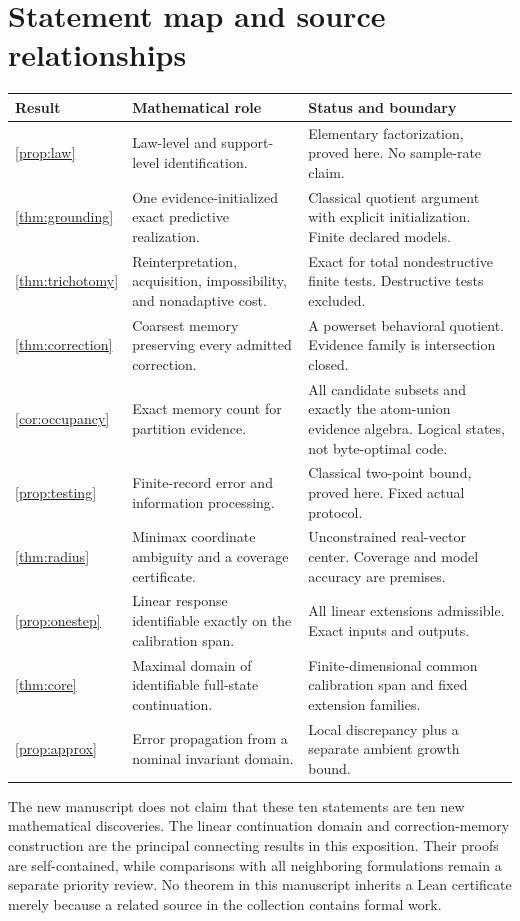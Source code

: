 \documentclass[11pt,letterpaper]{article}
\theoremstyle{plain}
\theoremstyle{definition}
\begin{document}
\section{Statement map and source relationships}\label{app:claims}
\begin{small}\begin{longtable}{@{}P{.13\linewidth}P{.44\linewidth}P{.35\linewidth}@{}}\toprule
Result & Mathematical role & Status and boundary\\\midrule\endhead
\ref{prop:law} & Law-level and support-level identification. & Elementary factorization, proved here. No sample-rate claim.\\
\ref{thm:grounding} & One evidence-initialized exact predictive realization. & Classical quotient argument with explicit initialization. Finite declared models.\\
\ref{thm:trichotomy} & Reinterpretation, acquisition, impossibility, and nonadaptive cost. & Exact for total nondestructive finite tests. Destructive tests excluded.\\
\ref{thm:correction} & Coarsest memory preserving every admitted correction. & A powerset behavioral quotient. Evidence family is intersection closed.\\
\ref{cor:occupancy} & Exact memory count for partition evidence. & All candidate subsets and exactly the atom-union evidence algebra. Logical states, not byte-optimal code.\\
\ref{prop:testing} & Finite-record error and information processing. & Classical two-point bound, proved here. Fixed actual protocol.\\
\ref{thm:radius} & Minimax coordinate ambiguity and a coverage certificate. & Unconstrained real-vector center. Coverage and model accuracy are premises.\\
\ref{prop:onestep} & Linear response identifiable exactly on the calibration span. & All linear extensions admissible. Exact inputs and outputs.\\
\ref{thm:core} & Maximal domain of identifiable full-state continuation. & Finite-dimensional common calibration span and fixed extension families.\\
\ref{prop:approx} & Error propagation from a nominal invariant domain. & Local discrepancy plus a separate ambient growth bound.\\\bottomrule
\end{longtable}\end{small}

The new manuscript does not claim that these ten statements are ten new mathematical discoveries. The linear continuation domain and correction-memory construction are the principal connecting results in this exposition. Their proofs are self-contained, while comparisons with all neighboring formulations remain a separate priority review. No theorem in this manuscript inherits a Lean certificate merely because a related source in the collection contains formal work.
\end{document}
